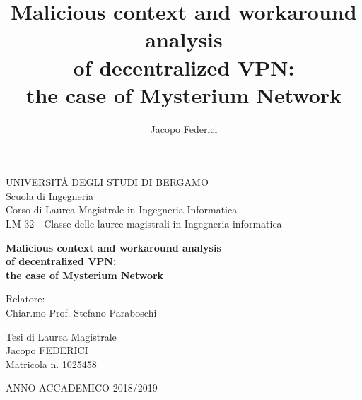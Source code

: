 \documentclass[12pt]{article}
\title{Malicious context and workaround analysis\\of decentralized VPN:\\the case of Mysterium Network}
\author{Jacopo Federici}
\begin{document}
	\raggedright


	\begin{titlepage}{\large}
		\begin{center}
			{\Large UNIVERSITÀ DEGLI STUDI DI BERGAMO}\\
			\bigskip
			{\large Scuola di Ingegneria}\\
			{\large Corso di Laurea Magistrale in Ingegneria Informatica}\\
			{\normalsize LM-32 - Classe delle lauree magistrali in Ingegneria informatica}\\
		\end{center}
		\vspace*{\fill}
		\begin{center}		
			\textbf{\Large Malicious context and workaround analysis\\
				of decentralized VPN:\\
				the case of Mysterium Network\\}
		\end{center}		
		\vspace*{\fill}
		\begin{flushleft}
			Relatore:\\
			Chiar.mo Prof. Stefano Paraboschi
		\end{flushleft}
		\bigskip	
		\begin{flushright}
			Tesi di Laurea Magistrale\\
			Jacopo FEDERICI\\
			Matricola n. 1025458
		\end{flushright}
		\bigskip
		\begin{center}
			ANNO ACCADEMICO 2018/2019
		\end{center}
	\end{titlepage}


	\clearpage
	
	\tableofcontents{}
	\pagebreak
\end{document}
